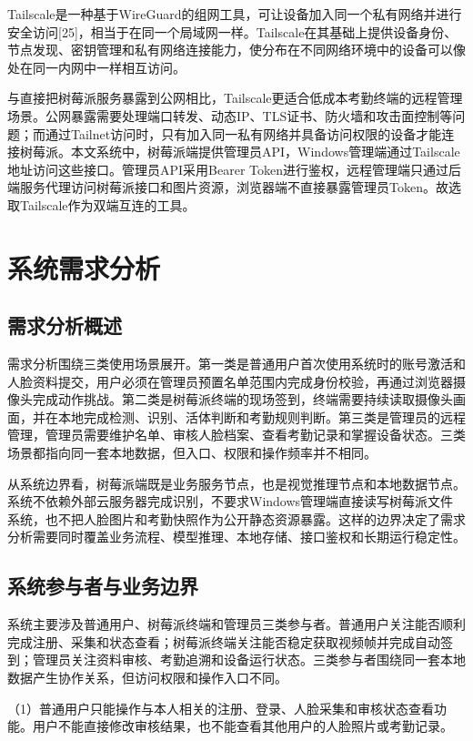 \documentclass[UTF8]{heuthesis}
\begin{document}
Tailscale是一种基于WireGuard的组网工具，可让设备加入同一个私有网络并进行安全访问[25]，相当于在同一个局域网一样。Tailscale在其基础上提供设备身份、节点发现、密钥管理和私有网络连接能力，使分布在不同网络环境中的设备可以像处在同一内网中一样相互访问。

与直接把树莓派服务暴露到公网相比，Tailscale更适合低成本考勤终端的远程管理场景。公网暴露需要处理端口转发、动态IP、TLS证书、防火墙和攻击面控制等问题；而通过Tailnet访问时，只有加入同一私有网络并具备访问权限的设备才能连接树莓派。本文系统中，树莓派端提供管理员API，Windows管理端通过Tailscale地址访问这些接口。管理员API采用Bearer Token进行鉴权，远程管理端只通过后端服务代理访问树莓派接口和图片资源，浏览器端不直接暴露管理员Token。故选取Tailscale作为双端互连的工具。

\chapter{系统需求分析}
\section{需求分析概述}
需求分析围绕三类使用场景展开。第一类是普通用户首次使用系统时的账号激活和人脸资料提交，用户必须在管理员预置名单范围内完成身份校验，再通过浏览器摄像头完成动作挑战。第二类是树莓派终端的现场签到，终端需要持续读取摄像头画面，并在本地完成检测、识别、活体判断和考勤规则判断。第三类是管理员的远程管理，管理员需要维护名单、审核人脸档案、查看考勤记录和掌握设备状态。三类场景都指向同一套本地数据，但入口、权限和操作频率并不相同。

从系统边界看，树莓派端既是业务服务节点，也是视觉推理节点和本地数据节点。系统不依赖外部云服务器完成识别，不要求Windows管理端直接读写树莓派文件系统，也不把人脸图片和考勤快照作为公开静态资源暴露。这样的边界决定了需求分析需要同时覆盖业务流程、模型推理、本地存储、接口鉴权和长期运行稳定性。

\section{系统参与者与业务边界}
系统主要涉及普通用户、树莓派终端和管理员三类参与者。普通用户关注能否顺利完成注册、采集和状态查看；树莓派终端关注能否稳定获取视频帧并完成自动签到；管理员关注资料审核、考勤追溯和设备运行状态。三类参与者围绕同一套本地数据产生协作关系，但访问权限和操作入口不同。

（1）普通用户只能操作与本人相关的注册、登录、人脸采集和审核状态查看功能。用户不能直接修改审核结果，也不能查看其他用户的人脸照片或考勤记录。
\end{document}
